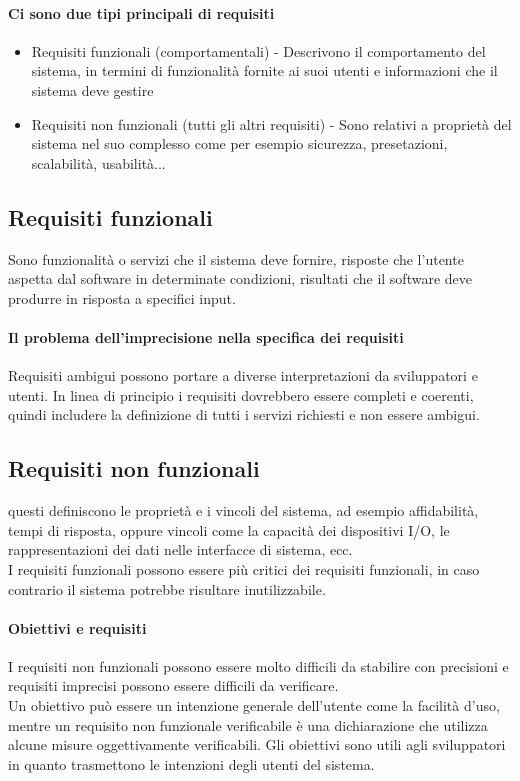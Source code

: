 \paragraph*{Ci sono due tipi principali di requisiti}
\begin{itemize}
    \item Requisiti funzionali (comportamentali) - Descrivono il comportamento del
    sistema, in termini di funzionalità fornite ai suoi utenti e informazioni
    che il sistema deve gestire
    \item Requisiti non funzionali (tutti gli altri requisiti) - Sono relativi
    a proprietà del sistema nel suo complesso come per esempio sicurezza, presetazioni,
    scalabilità, usabilità...
\end{itemize}
\subsection{Requisiti funzionali}
Sono funzionalità o servizi che il sistema deve fornire, risposte che l'utente
aspetta dal software in determinate condizioni, risultati che il software deve produrre
in risposta a specifici input.
\paragraph{Il problema dell'imprecisione nella specifica dei requisiti}
Requisiti ambigui possono portare a diverse interpretazioni da sviluppatori e utenti.
In linea di principio i requisiti dovrebbero essere completi e coerenti, quindi
includere la definizione di tutti i servizi richiesti e non essere ambigui.
\subsection{Requisiti non funzionali}
questi definiscono le proprietà e i vincoli del sistema, ad esempio affidabilità,
tempi di risposta, oppure vincoli come la capacità dei dispositivi I/O,
le rappresentazioni dei dati nelle interfacce di sistema, ecc.
\\I requisiti funzionali possono essere più critici dei requisiti funzionali, in caso
contrario il sistema potrebbe risultare inutilizzabile.
\paragraph*{Obiettivi e requisiti} I requisiti non funzionali possono essere molto
difficili da stabilire con precisioni e requisiti imprecisi possono essere
difficili da verificare.
\\ Un obiettivo può essere un intenzione generale dell'utente come la facilità d'uso,
mentre un requisito non funzionale verificabile è una dichiarazione che utilizza
alcune misure oggettivamente verificabili.
Gli obiettivi sono utili agli sviluppatori in quanto trasmettono le intenzioni degli
utenti del sistema.
